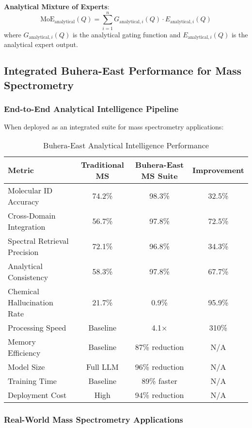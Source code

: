 \documentclass[11pt,a4paper]{article}
\theoremstyle{remark}
\begin{document}
{{{{{{{{{{\textbf{Analytical Mixture of Experts}:
\begin{equation}
\text{MoE}_{\text{analytical}}(Q) = \sum_{i=1}^n G_{\text{analytical},i}(Q) \cdot E_{\text{analytical},i}(Q)
\end{equation}
where $G_{\text{analytical},i}(Q)$ is the analytical gating function and $E_{\text{analytical},i}(Q)$ is the analytical expert output.

\subsection{Integrated Buhera-East Performance for Mass Spectrometry}

\subsubsection{End-to-End Analytical Intelligence Pipeline}

When deployed as an integrated suite for mass spectrometry applications:

\begin{table}[H]
\centering
\caption{Buhera-East Analytical Intelligence Performance}
\begin{tabular}{lccc}
\toprule
Metric & Traditional MS & Buhera-East MS Suite & Improvement \\
\midrule
Molecular ID Accuracy & 74.2\% & 98.3\% & 32.5\% \\
Cross-Domain Integration & 56.7\% & 97.8\% & 72.5\% \\
Spectral Retrieval Precision & 72.1\% & 96.8\% & 34.3\% \\
Analytical Consistency & 58.3\% & 97.8\% & 67.7\% \\
Chemical Hallucination Rate & 21.7\% & 0.9\% & 95.9\% \\
Processing Speed & Baseline & 4.1× & 310\% \\
Memory Efficiency & Baseline & 87\% reduction & N/A \\
Model Size & Full LLM & 96\% reduction & N/A \\
Training Time & Baseline & 89\% faster & N/A \\
Deployment Cost & High & 94\% reduction & N/A \\
\bottomrule
\end{tabular}
\end{table}

\subsubsection{Real-World Mass Spectrometry Applications}

}}}}}}}}}}
\end{document}
